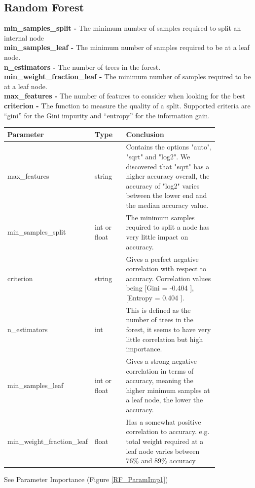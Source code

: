 \documentclass[11pt]{article}
\begin{document}
\newpage
\subsection{Random Forest}
\cite{SklearnEnsembleRandomForestClassifier}
\par
\textbf{min\_samples\_split -} The minimum number of samples required to split an internal node \\
\textbf{min\_samples\_leaf -} The minimum number of samples required to be at a leaf node.  \\
\textbf{n\_estimators -} The number of trees in the forest.\\
\textbf{min\_weight\_fraction\_leaf -} The minimum number of samples required to be at a leaf node. \\
\textbf{max\_features -} The number of features to consider when looking for the best \\
\textbf{criterion -} The function to measure the quality of a split. Supported criteria are “gini” for the Gini impurity and “entropy” for the information gain. \\


\begin{table}[ht]
  \centering
  \begin{tabular}{|p{0.25\linewidth} | p{0.15 \linewidth} | p{0.45\linewidth}|} 
    \hline
    \textbf{Parameter}  & \textbf{Type} & \textbf{Conclusion} \\ \hline
    max\_features & string & Contains the options "auto", "sqrt" and "log2". We discovered that "sqrt" has a higher accuracy overall, the accuracy of "log2" varies between the lower end and the median accuracy value.\\ \hline
    min\_samples\_split & int or float & The minimum samples required to split a node has very little impact on accuracy.  \\ \hline
    criterion & string & Gives a perfect negative correlation with respect to accuracy. Correlation values being [Gini = -0.404 ], [Entropy = 0.404 ]. \\ \hline
    n\_estimators & int & This is defined as the number of trees in the forest, it seems to have very little correlation but high importance. \\ \hline
    min\_samples\_leaf & int or float & Gives a strong negative correlation in terms of accuracy, meaning the higher minimum samples at a leaf node, the lower the accuracy. \\ \hline
    min\_weight\_fraction\_leaf & float & Has a somewhat positive correlation to accuracy. e.g. total weight required at a leaf node varies between 76\% and 89\% accuracy\\ \hline
  \end{tabular}
\end{table}\label{RF_Analysis_Table}
See Parameter Importance (Figure \ref{RF_ParamImp1})
\end{document}
